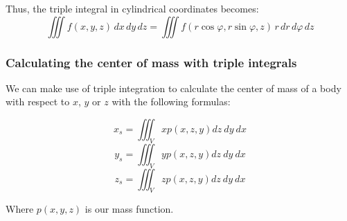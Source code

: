 Thus, the triple integral in cylindrical coordinates becomes:
\[
\iiint f(x, y, z)\, dx\, dy\, dz = \iiint f(r \cos \varphi, r \sin \varphi, z)\, r\, dr\, d\varphi\, dz
\]

\subsubsection{Calculating the center of mass with triple integrals}

We can make use of triple integration to calculate the center of mass of a body with
respect to \(x\), \(y\) or \(z\) with the following formulas:

\[x_s = \iiint_V xp(x,z,y)dz\ dy \ dx\]
\[y_s = \iiint_V yp(x,z,y)dz\ dy \ dx\]
\[z_s = \iiint_V zp(x,z,y)dz\ dy \ dx\]

Where \(p(x,y,z)\) is our mass function.
\newpage
